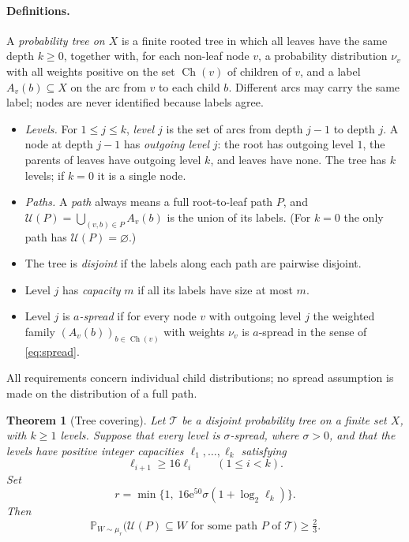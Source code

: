 \documentclass[11pt]{article}
\newtheorem{theorem}{Theorem}[section]
\numberwithin{equation}{section}
\newcommand{\PP}{\mathbb P}
\newcommand{\TT}{\mathcal T}
\newcommand{\UU}{\mathcal U}
\newcommand{\ch}{\operatorname{Ch}}
\newcommand{\ee}{\mathrm e}
\begin{document}
\paragraph{Definitions.}
A \emph{probability tree on $X$} is a finite rooted tree in which all
leaves have the same depth $k\ge0$, together with, for each non-leaf
node $v$, a probability distribution $\nu_v$ with all weights positive
on the set $\ch(v)$ of children of $v$, and a label
$A_v(b)\subseteq X$ on the arc from $v$ to each child $b$. Different
arcs may carry the same label; nodes are never identified because
labels agree.
\begin{itemize}[leftmargin=1.6em,itemsep=2pt]
 \item \emph{Levels.} For $1\le j\le k$, \emph{level $j$} is the set of
 arcs from depth $j-1$ to depth $j$. A node at depth $j-1$ has
 \emph{outgoing level} $j$: the root has outgoing level $1$, the
 parents of leaves have outgoing level $k$, and leaves have none. The
 tree has $k$ levels; if $k=0$ it is a single node.
 \item \emph{Paths.} A \emph{path} always means a full root-to-leaf
 path $P$, and $\UU(P)=\bigcup_{(v,b)\in P}A_v(b)$ is the union of its
 labels. (For $k=0$ the only path has $\UU(P)=\varnothing$.)
 \item The tree is \emph{disjoint} if the labels along each path are
 pairwise disjoint.
 \item Level $j$ has \emph{capacity} $m$ if all its labels have size at
 most $m$.
 \item Level $j$ is \emph{$a$-spread} if for every node $v$ with
 outgoing level $j$ the weighted family $(A_v(b))_{b\in\ch(v)}$ with
 weights $\nu_v$ is $a$-spread in the sense of \eqref{eq:spread}.
\end{itemize}
All requirements concern individual child distributions; no spread
assumption is made on the distribution of a full path.

\begin{theorem}[Tree covering]\label{thm:tree}
Let $\TT$ be a disjoint probability tree on a finite set $X$,
with $k\ge1$ levels. Suppose that every level is $\sigma$-spread,
where $\sigma>0$, and that the levels have positive integer capacities
$\ell_1,\ldots,\ell_k$ satisfying
\[
 \ell_{i+1}\ge16\ell_i\qquad(1\le i<k).
\]
Set
\[
 r=\min\{1,\;16\ee^{50}\sigma(1+\log_2\ell_k)\}.
\]
Then
\[
 \PP_{W\sim\mu_r}
 \bigl(\UU(P)\subseteq W\text{ for some path }P\text{ of }\TT\bigr)
 \ge\tfrac23.
\]
\end{theorem}
\end{document}
